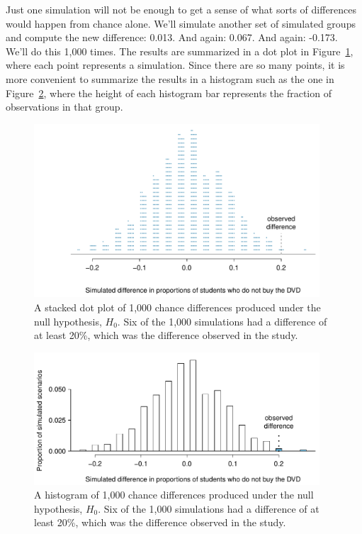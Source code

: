 Just one simulation will not be enough to get a sense of what sorts of differences would happen from chance alone. We'll simulate another set of simulated groups and compute the new difference: 0.013. And again: 0.067. And again: -0.173. We'll do this 1,000 times. The results are summarized in a dot plot in Figure~\ref{OpportunityCostDiffsDotPlot}, where each point represents a simulation. Since there are so many points, it is more convenient to summarize the results in a histogram such as the one in Figure~\ref{OpportunityCostDiffs}, where the height of each histogram bar represents the fraction of observations in that group.

\begin{figure}[ht]
\centering
\includegraphics[width=0.95\textwidth]{02/figures/OpportunityCost/OpportunityCostDiffsDotPlot}
\caption{A stacked dot plot of 1,000 chance differences produced under the null hypothesis, $H_0$. Six of the 1,000 simulations had a difference of at least 20\%, which was the difference observed in the study.}
\label{OpportunityCostDiffsDotPlot}
\end{figure}

\begin{figure}[ht]
\centering
\includegraphics[width=0.95\textwidth]{02/figures/OpportunityCost/OpportunityCostDiffsRightTail}
\caption{A histogram of 1,000 chance differences produced under the null hypothesis, $H_0$. Six of the 1,000 simulations had a difference of at least 20\%, which was the difference observed in the study.}
\label{OpportunityCostDiffs}
\end{figure}

